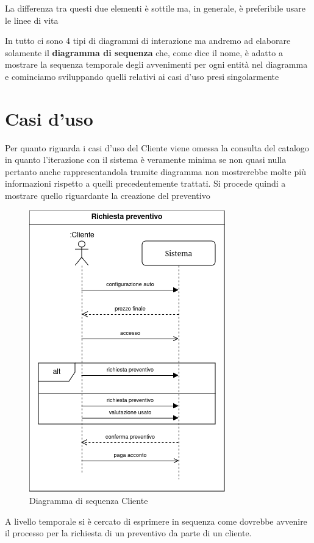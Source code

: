 \documentclass[a4paper, 11pt,oneside]{book}
\newcommand{\spacing}{\par\bigskip\noindent}
\begin{document}
    La differenza tra questi due elementi è sottile ma, in generale, è preferibile usare le linee di vita
    \spacing
    In tutto ci sono 4 tipi di diagrammi di interazione ma andremo ad elaborare solamente il \textbf{diagramma di sequenza} che, come dice il nome, è adatto a mostrare la sequenza
    temporale degli avvenimenti per ogni entità nel diagramma e cominciamo sviluppando quelli relativi ai casi d'uso presi singolarmente
    \spacing
    \section{Casi d'uso}
        Per quanto riguarda i casi d'uso del Cliente viene omessa la consulta del catalogo in quanto l'iterazione con il sistema è veramente minima se non quasi nulla pertanto anche rappresentandola tramite
        diagramma non mostrerebbe molte più informazioni rispetto a quelli precedentemente trattati. Si procede quindi a mostrare quello riguardante la creazione del preventivo
        \begin{figure}[H]
            \centering
            \includegraphics[scale=0.75]{sequence_diagram_preventivo.png}
            \caption{Diagramma di sequenza Cliente}
            \label{fig:diagramma_sequenza_utente}
        \end{figure}
        \spacing
        A livello temporale si è cercato di esprimere in sequenza come dovrebbe avvenire il processo per la richiesta di un preventivo da parte di un cliente.
\end{document}
